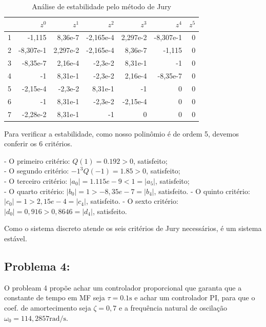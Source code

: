     \begin{table}[!ht]
        \centering
        \caption{Análise de estabilidade pelo método de Jury} 
        \begin{tabular}{l| r r r r r r}
            & $z^0$ & $z^1$ & $z^2$ & $z^3$ & $z^4$ & $z^5$\\
            \hline
            1 & -1{,}115 & 8{,}36e-7 & -2{,}165e-4 & 2{,}297e-2 & -8{,}307e-1 & 0\\
            2 & -8{,}307e-1 & 2{,}297e-2 & -2{,}165e-4  & 8{,}36e-7 & -1{,}115 & 0\\
            3 & -8{,}35e-7 & 2{,}16e-4 & -2{,}3e-2  & 8{,}31e-1 & -1 & 0\\
            4 & -1 & 8{,}31e-1 & -2{,}3e-2  & 2{,}16e-4 & -8{,}35e-7 & 0\\
            5 & -2{,}15e-4 & -2{,}3e-2 & 8{,}31e-1  & -1 & 0 & 0\\
            6 & -1 &  8{,}31e-1  & -2{,}3e-2 & -2{,}15e-4 & 0 & 0\\
            7 & -2{,}28e-2 & 8{,}31e-1  & -1 & 0 & 0 & 0\\

        \end{tabular}                
        \label{tab:JE3}    
    \end{table}

    Para verificar a estabilidade, como nosso polinômio é de ordem 5, devemos conferir os 6 critérios.

    - O primeiro critério: $Q(1)= 0.192 > 0$, satisfeito; \\
    - O segundo critério: $-1^3 Q(-1) = 1.85 > 0$, satisfeito;\\
    - O terceiro critério: $|a_0| = 1.115e-9 < 1 = |a_5|$, satisfeito; \\
    - O quarto critério: $|b_0| = 1 >-8,35e-7 = |b_4| $, satisfeito. 
    - O quinto critério: $|c_0| = 1 > 2,15e-4 = |c_4| $, satisfeito. 
    - O sexto critério: $|d_0| = 0,916 > 0,8646 = |d_4| $, satisfeito. 
    
    Como o sistema discreto atende os seis critérios de Jury necessários, é um sistema estável.    

\newpage    
\subsection*{Problema 4:}

 O probleam 4 propõe achar um controlador proporcional que garanta que a constante de tempo em MF seja $\tau = 0.1\text{s}$ 
 e achar um controlador PI, para que o coef. de amortecimento seja $\zeta = 0,7$ e a frequência natural de oscilação 
 $\omega_0 = 114,2857 \text{rad/s}$. 

